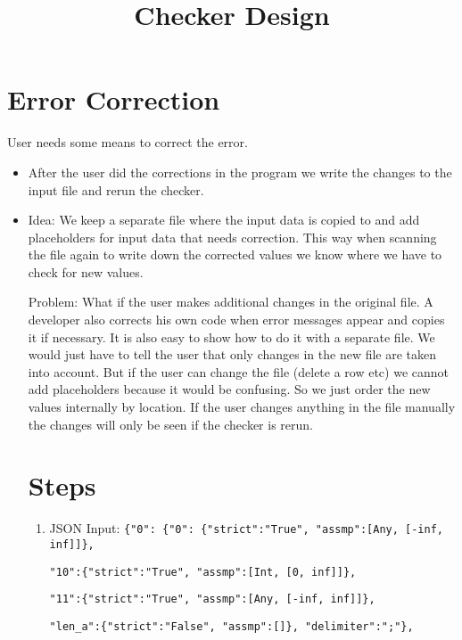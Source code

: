 \documentclass[11pt]{article}
\begin{document}
\title{Checker Design}
\maketitle


\section{Error Correction}

User needs some means to correct the error. 

\begin{itemize}
  \item After the user did the corrections in the program we write the changes to the input file and rerun the checker.
  \item Idea: We keep a separate file where the input data is copied to and add placeholders for input data that needs correction. This way when scanning the file again to write down the corrected values we know where we have to check for new values.
  
  Problem: What if the user makes additional changes in the original file. A developer also corrects his own code when error messages appear and copies it if necessary. It is also easy to show how to do it with a separate file. We would just have to tell the user that only changes in the new file are taken into account. But if the user can change the file (delete a row etc) we cannot add placeholders because it would be confusing. So we just order the new values internally by location. If the user changes anything in the file manually the changes will only be seen if the checker is rerun.
\begin{itemize}


\section{Steps}

\begin{enumerate}
\item JSON Input: \verb|{"0": {"0": {"strict":"True", "assmp":[Any, [-inf, inf]]}, |

\verb|"10":{"strict":"True", "assmp":[Int, [0, inf]]}, |

\verb|"11":{"strict":"True", "assmp":[Any, [-inf, inf]]}, |

\verb|"len_a":{"strict":"False", "assmp":[]}, "delimiter":";"}, |


\end{enumerate}
\end{itemize}
\end{itemize}
\end{document}
